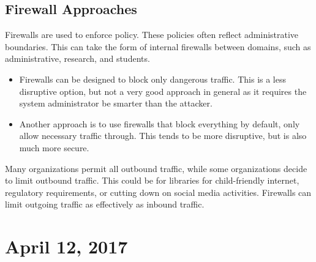 \documentclass[11pt]{article}
\theoremstyle{plain} %
\theoremstyle{definition}
\theoremstyle{example}
\theoremstyle{remark}
\begin{document}
\subsection{Firewall Approaches}
Firewalls are used to enforce policy. These policies often reflect administrative boundaries. This can take the form of internal firewalls between domains, such as administrative, research, and students. 
\begin{itemize}
	\item Firewalls can be designed to block only dangerous traffic. This is a less disruptive option, but not a very good approach in general as it requires the system administrator be smarter than the attacker. 
	\item Another approach is to use firewalls that block everything by default, only allow necessary traffic through. This tends to be more disruptive, but is also much more secure. 
	\end{itemize}

Many organizations permit all outbound traffic, while some organizations decide to limit outbound traffic. This could be for libraries for child-friendly internet, regulatory requirements, or cutting down on social media activities. Firewalls can limit outgoing traffic as effectively as inbound traffic. 

\section{April 12, 2017}
\end{document}
